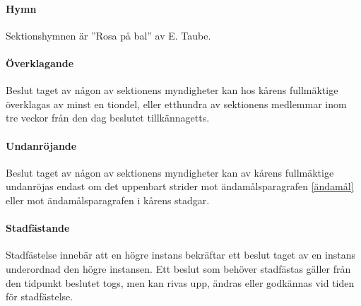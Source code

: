 \documentclass{dsekstatutes}
\begin{document}
\paragraph{Hymn}
Sektionshymnen är ”Rosa på bal” av E. Taube.

\paragraph{Överklagande}
Beslut taget av någon av sektionens myndigheter kan hos kårens fullmäktige
överklagas av minst en tiondel, eller etthundra av sektionens medlemmar inom tre
veckor från den dag beslutet tillkännagetts.

\paragraph{Undanröjande}
Beslut taget av någon av sektionens myndigheter kan av kårens fullmäktige
undanröjas endast om det uppenbart strider mot ändamålsparagrafen \ref{ändamål}
eller mot ändamålsparagrafen i kårens stadgar.

\paragraph{Stadfästande}
Stadfästelse innebär att en högre instans bekräftar ett beslut taget av en
instans underordnad den högre instansen. Ett beslut som behöver stadfästas
gäller från den tidpunkt beslutet togs, men kan rivas upp, ändras eller
godkännas vid tiden för stadfästelse.
\end{document}
